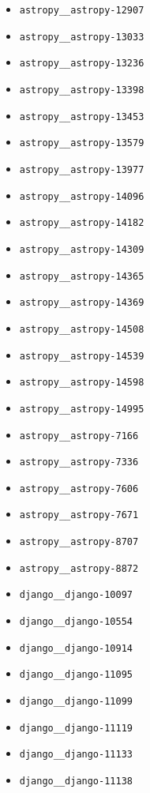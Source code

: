 \begin{multicols}{2}
\begin{itemize}
    \item \texttt{astropy\_\_astropy-12907}
    \item \texttt{astropy\_\_astropy-13033}
    \item \texttt{astropy\_\_astropy-13236}
    \item \texttt{astropy\_\_astropy-13398}
    \item \texttt{astropy\_\_astropy-13453}
    \item \texttt{astropy\_\_astropy-13579}
    \item \texttt{astropy\_\_astropy-13977}
    \item \texttt{astropy\_\_astropy-14096}
    \item \texttt{astropy\_\_astropy-14182}
    \item \texttt{astropy\_\_astropy-14309}
    \item \texttt{astropy\_\_astropy-14365}
    \item \texttt{astropy\_\_astropy-14369}
    \item \texttt{astropy\_\_astropy-14508}
    \item \texttt{astropy\_\_astropy-14539}
    \item \texttt{astropy\_\_astropy-14598}
    \item \texttt{astropy\_\_astropy-14995}
    \item \texttt{astropy\_\_astropy-7166}
    \item \texttt{astropy\_\_astropy-7336}
    \item \texttt{astropy\_\_astropy-7606}
    \item \texttt{astropy\_\_astropy-7671}
    \item \texttt{astropy\_\_astropy-8707}
    \item \texttt{astropy\_\_astropy-8872}
    \item \texttt{django\_\_django-10097}
    \item \texttt{django\_\_django-10554}
    \item \texttt{django\_\_django-10914}
    \item \texttt{django\_\_django-11095}
    \item \texttt{django\_\_django-11099}
    \item \texttt{django\_\_django-11119}
    \item \texttt{django\_\_django-11133}
    \item \texttt{django\_\_django-11138}

\end{itemize}
\end{multicols}
